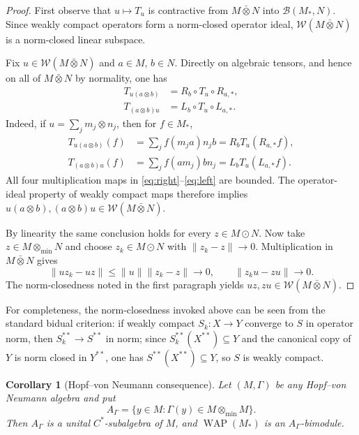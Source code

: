 \documentclass[11pt]{article}
\newtheorem{corollary}[theorem]{Corollary}
\newcommand{\WAP}{\operatorname{WAP}}
\newcommand{\WC}{\mathcal W}
\begin{document}
\begin{proof}
First observe that $u\mapsto T_u$ is contractive from $M\bar\otimes N$ into
$\mathcal B(M_*,N)$.  Since weakly compact operators form a norm-closed
operator ideal, $\WC(M\bar\otimes N)$ is a norm-closed linear subspace.

Fix $u\in\WC(M\bar\otimes N)$ and $a\in M$, $b\in N$.  Directly on algebraic
tensors, and hence on all of $M\bar\otimes N$ by normality, one has
\begin{align}
 T_{u(a\otimes b)}
   &=R_b\circ T_u\circ R_{a,*}, \label{eq:right}\\
 T_{(a\otimes b)u}
   &=L_b\circ T_u\circ L_{a,*}. \label{eq:left}
\end{align}
Indeed, if $u=\sum_jm_j\otimes n_j$, then for $f\in M_*$,
\begin{align*}
 T_{u(a\otimes b)}(f)
 &=\sum_j f(m_ja)n_jb
 =R_bT_u(R_{a,*}f),\\
 T_{(a\otimes b)u}(f)
 &=\sum_j f(am_j)bn_j
 =L_bT_u(L_{a,*}f).
\end{align*}
All four multiplication maps in \eqref{eq:right}--\eqref{eq:left} are bounded.
The operator-ideal property of weakly compact maps therefore implies
$u(a\otimes b),(a\otimes b)u\in\WC(M\bar\otimes N)$.

By linearity the same conclusion holds for every
$z\in M\odot N$.  Now take $z\in M\otimes_{\min}N$ and choose
$z_k\in M\odot N$ with $\lVert z_k-z\rVert\to0$.  Multiplication in
$M\bar\otimes N$ gives
\[
 \lVert uz_k-uz\rVert\leq\lVert u\rVert\lVert z_k-z\rVert\to0,
 \qquad
 \lVert z_ku-zu\rVert\to0.
\]
The norm-closedness noted in the first paragraph yields
$uz,zu\in\WC(M\bar\otimes N)$.
\end{proof}

For completeness, the norm-closedness invoked above can be seen from the
standard bidual criterion: if weakly compact $S_k:X\to Y$ converge to $S$ in
operator norm, then $S_k^{**}\to S^{**}$ in norm; since
$S_k^{**}(X^{**})\subseteq Y$ and the canonical copy of $Y$ is norm closed in
$Y^{**}$, one has $S^{**}(X^{**})\subseteq Y$, so $S$ is weakly compact.

\begin{corollary}[Hopf--von Neumann consequence]
Let $(M,\Gamma)$ be any Hopf--von Neumann algebra and put
\[
 A_\Gamma=\{y\in M:\Gamma(y)\in M\otimes_{\min}M\}.
\]
Then $A_\Gamma$ is a unital $C^*$-subalgebra of $M$, and
$\WAP(M_*)$ is an $A_\Gamma$-bimodule.
\end{corollary}
\end{document}
